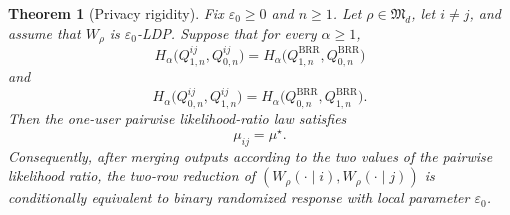 \documentclass[10pt,a4paper]{amsart}
\newtheorem{theorem}{Theorem}
\newcommand{\fM}{\mathfrak M}
\begin{document}
\begin{theorem}[Privacy rigidity]\label{thm:privacy-rigidity}
Fix $\varepsilon_0\ge 0$ and $n\ge 1$. Let $\rho\in\fM_d$, let $i\neq j$, and assume that $W_\rho$ is $\varepsilon_0$-LDP. Suppose that for every $\alpha\ge 1$,
\[
H_\alpha\bigl(Q_{1,n}^{ij},Q_{0,n}^{ij}\bigr)
=
H_\alpha\bigl(Q_{1,n}^{\mathrm{BRR}},Q_{0,n}^{\mathrm{BRR}}\bigr)
\]
and
\[
H_\alpha\bigl(Q_{0,n}^{ij},Q_{1,n}^{ij}\bigr)
=
H_\alpha\bigl(Q_{0,n}^{\mathrm{BRR}},Q_{1,n}^{\mathrm{BRR}}\bigr).
\]
Then the one-user pairwise likelihood-ratio law satisfies
\[
\mu_{ij}=\mu^\star.
\]
Consequently, after merging outputs according to the two values of the pairwise likelihood ratio, the two-row reduction of $(W_\rho(\cdot\mid i),W_\rho(\cdot\mid j))$ is conditionally equivalent to binary randomized response with local parameter $\varepsilon_0$.
\end{theorem}
\end{document}
